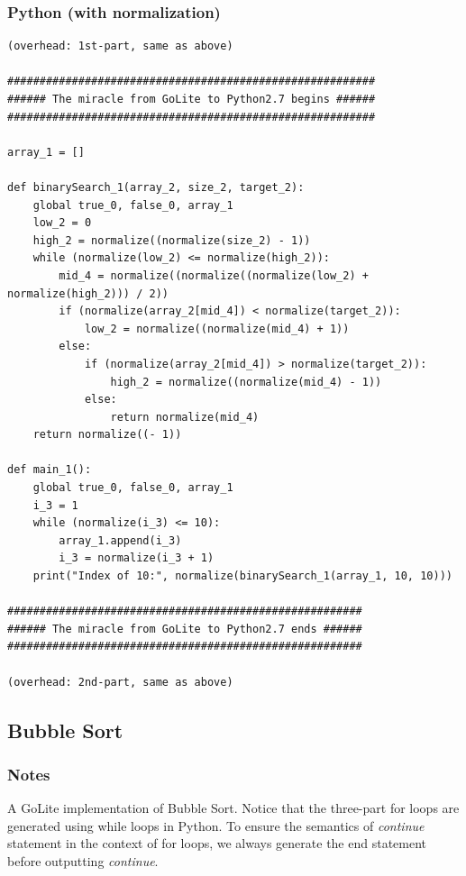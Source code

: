 \documentclass{article}
\begin{document}
\subsubsection{Python (with normalization)}
\begin{lstlisting}
(overhead: 1st-part, same as above)

#########################################################
###### The miracle from GoLite to Python2.7 begins ######
#########################################################

array_1 = []

def binarySearch_1(array_2, size_2, target_2):
	global true_0, false_0, array_1
	low_2 = 0
	high_2 = normalize((normalize(size_2) - 1))
	while (normalize(low_2) <= normalize(high_2)):
		mid_4 = normalize((normalize((normalize(low_2) + normalize(high_2))) / 2))
		if (normalize(array_2[mid_4]) < normalize(target_2)):
			low_2 = normalize((normalize(mid_4) + 1))
		else:
			if (normalize(array_2[mid_4]) > normalize(target_2)):
				high_2 = normalize((normalize(mid_4) - 1))
			else:
				return normalize(mid_4)
	return normalize((- 1))

def main_1():
	global true_0, false_0, array_1
	i_3 = 1
	while (normalize(i_3) <= 10):
		array_1.append(i_3)
		i_3 = normalize(i_3 + 1)
	print("Index of 10:", normalize(binarySearch_1(array_1, 10, 10)))

#######################################################
###### The miracle from GoLite to Python2.7 ends ######
#######################################################

(overhead: 2nd-part, same as above)
\end{lstlisting}

\subsection{Bubble Sort}
\subsubsection{Notes}
A GoLite implementation of Bubble Sort. Notice that the three-part for
loops are generated using while loops in Python. To ensure the semantics
of \textit{continue} statement in the context of for loops, we always
generate the end statement before outputting \textit{continue}.
\end{document}
